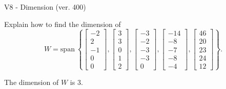 \begin{exercise}
  \begin{exerciseTitle}V8 - Dimension (ver. 400)\end{exerciseTitle}
  \begin{exerciseStatement}
    Explain how to find the dimension of 
\[W=\mathrm{span}\ \left\{\left[\begin{array}{r}
-2 \\
2 \\
-1 \\
0 \\
0
\end{array}\right] , \left[\begin{array}{r}
3 \\
3 \\
0 \\
1 \\
2
\end{array}\right] , \left[\begin{array}{r}
-3 \\
-2 \\
-3 \\
-3 \\
0
\end{array}\right] , \left[\begin{array}{r}
-14 \\
-8 \\
-7 \\
-8 \\
-4
\end{array}\right] , \left[\begin{array}{r}
46 \\
20 \\
23 \\
24 \\
12
\end{array}\right]\right\}.\]



  \end{exerciseStatement}
  \begin{exerciseAnswer}
   The dimension of \(W\) is  \(3\).
  


  \end{exerciseAnswer}
\end{exercise}